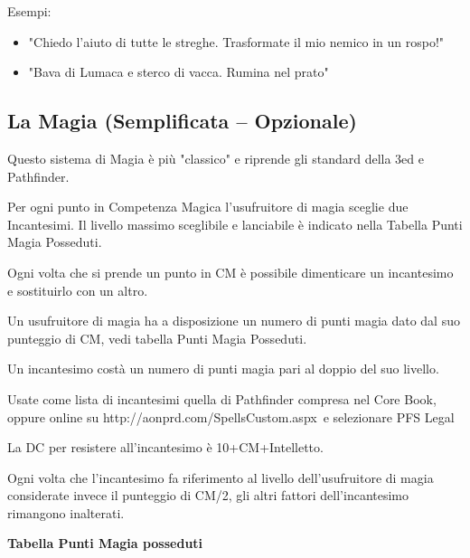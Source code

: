 \documentclass[a4paper,11pt,twoside,openany]{book}
\begin{document}
\bigskip


Esempi:
\begin{itemize}
	\item
	 "Chiedo l'aiuto di tutte le streghe. Trasformate il mio nemico in un rospo!"
	\item
	 "Bava di Lumaca e sterco di vacca. Rumina nel prato"
\end{itemize}

\pagebreak

\subsection{La Magia (Semplificata -- Opzionale)}


Questo sistema di Magia è più "classico" e riprende gli standard della 3ed e Pathfinder.

Per ogni punto in Competenza Magica l'usufruitore di magia sceglie due Incantesimi. Il livello massimo sceglibile e lanciabile è indicato nella Tabella Punti Magia Posseduti.

Ogni volta che si prende un punto in CM è possibile dimenticare un incantesimo e sostituirlo con un altro.

Un usufruitore di magia ha a disposizione un numero di punti magia dato dal suo punteggio di CM, vedi tabella Punti Magia Posseduti.

Un incantesimo costà un numero di punti magia pari al doppio del suo livello.

Usate come lista di incantesimi quella di Pathfinder compresa nel Core Book, oppure online su http://aonprd.com/SpellsCustom.aspx\ e selezionare PFS Legal

La DC per resistere all'incantesimo è 10+CM+Intelletto.

Ogni volta che l'incantesimo fa riferimento al livello dell'usufruitore di magia considerate invece il punteggio di CM/2, gli altri fattori dell'incantesimo rimangono inalterati.

\bigskip

\textbf{Tabella Punti Magia posseduti}

\bigskip
\end{document}
